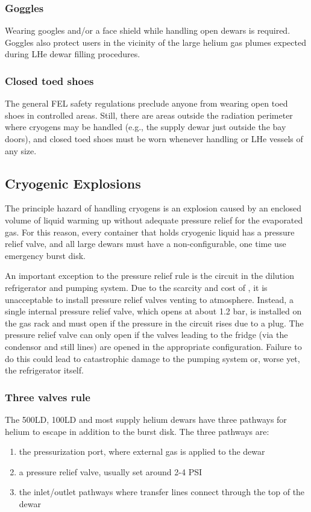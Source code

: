 \subsubsection{Goggles}
Wearing googles and/or a face shield while handling open \lnn{} dewars is required.  Goggles also protect users in the vicinity of the large helium gas plumes expected during LHe dewar filling procedures.

\subsubsection{Closed toed shoes}
The general FEL safety regulations preclude anyone from wearing open toed shoes in controlled areas.  Still, there are areas outside the radiation perimeter where cryogens may be handled (e.g., the supply dewar just outside the bay doors), and closed toed shoes must be worn whenever handling \lnn{} or LHe vessels of any size.
 
\subsection{Cryogenic Explosions}
The principle hazard of handling cryogens is an explosion caused by an enclosed volume of liquid warming up without adequate pressure relief for the evaporated gas.  For this reason, every container that holds cryogenic liquid has a pressure relief valve, and all large dewars must have a non-configurable, one time use emergency burst disk.  


An important exception to the pressure relief rule is the \het{} circuit in the dilution refrigerator and pumping system.  Due to the scarcity and cost of \het, it is unacceptable to install pressure relief valves venting to atmosphere.  Instead, a single internal pressure relief valve, which opens at about 1.2 bar, is installed on the \het{} gas rack and must open if the pressure in the circuit rises due to a plug.  The pressure relief valve can only open if the valves leading to the fridge (via the condensor and still lines) are opened in the appropriate configuration.  Failure to do this could lead to catastrophic damage to the pumping system or, worse yet, the refrigerator itself.  

\subsubsection{Three valves rule}

The 500LD, 100LD and most supply helium dewars have three pathways for helium to escape in addition to the burst disk.  The three pathways are:
\begin{enumerate}
\item the pressurization port, where external gas is applied to the dewar
\item a pressure relief valve, usually set around 2-4 PSI
\item the inlet/outlet pathways where transfer lines connect through the top of the dewar 
\end{enumerate}

